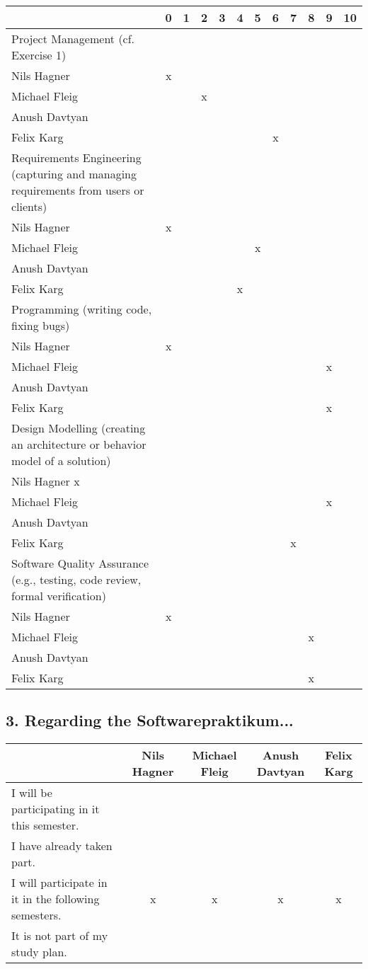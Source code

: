 \documentclass{scrartcl}
\begin{document}
\begin{tabular}{| p{10cm} | c | c | c | c | c | c | c | c | c | c | c |}
	\hline
	& 0& 1& 2& 3& 4& 5& 6& 7& 8& 9& 10\\
	\hline
	Project Management (cf. Exercise 1) \\
	\hline
	Nils Hagner &x&&&&&&&&&\\ \hline
	Michael Fleig &&&x&&&&&&&\\ \hline
	Anush Davtyan &&&&&&&&&&\\ \hline
	Felix Karg &&&&&&&x&&&\\ \hline
	Requirements Engineering (capturing and managing requirements from users or clients)\\
	\hline
	Nils Hagner &x&&&&&&&&&\\ \hline
	Michael Fleig &&&&&&x&&&&\\ \hline
	Anush Davtyan &&&&&&&&&&\\ \hline
	Felix Karg &&&&&x&&&&&\\ \hline
	Programming (writing code, fixing bugs)\\
	\hline
	Nils Hagner &x&&&&&&&&&\\ \hline
	Michael Fleig &&&&&&&&&&x&\\ \hline
	Anush Davtyan &&&&&&&&&&\\ \hline
	Felix Karg &&&&&&&&&&x\\ \hline
	Design Modelling (creating an architecture or behavior model of a solution)\\
	\hline
	Nils Hagner x&&&&&&&&&&\\ \hline
	Michael Fleig &&&&&&&&&&x\\ \hline
	Anush Davtyan &&&&&&&&&&\\ \hline
	Felix Karg &&&&&&&&x&&\\ \hline
	Software Quality Assurance (e.g., testing, code review, formal verification)\\
	\hline
	Nils Hagner &x&&&&&&&&&\\ \hline
	Michael Fleig &&&&&&&&&x&\\ \hline
	Anush Davtyan &&&&&&&&&&\\ \hline
	Felix Karg &&&&&&&&&x&\\ \hline
\end{tabular}


\subsection*{3. Regarding the Softwarepraktikum...}
\begin{tabular} {| p{7cm} | c | c | c | c |}
	\hline
	&Nils Hagner&Michael Fleig&Anush Davtyan&Felix Karg\\
	\hline
	I will be participating in it this semester. &&&&\\
	\hline
	I have already taken part. &&&&\\
	\hline
	I will participate in it in the following semesters. &x&x&x&x\\
	\hline
	It is not part of my study plan. &&&&\\
	\hline
\end{tabular}
\end{document}
